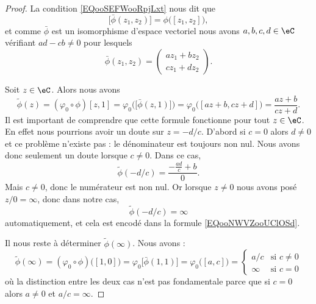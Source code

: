 \begin{proof}
    La condition \eqref{EQooSEFWooRpjLxt} nous dit que
    \begin{equation}
        \big[ \bar \phi(z_1,z_2) \big]=\phi\big( [z_1,z_2] \big),
    \end{equation}
    et comme \( \bar \phi\) est un isomorphisme d'espace vectoriel nous avons \( a,b,c,d\in \eC\) vérifiant \( ad-cb\neq 0\) pour lesquels
    \begin{equation}
        \bar \phi(z_1,z_2)=\begin{pmatrix}
            az_1+bz_2    \\ 
            cz_1+dz_2    
        \end{pmatrix}.
    \end{equation}
    
    Soit \( z\in \eC\). Alors nous avons
    \begin{equation}        \label{EQooNWVZooUClOSd}
        \tilde \phi(z)=(\varphi_0\circ\phi)[z,1]=\varphi_0\Big( \big[ \bar\phi(z,1) \big] \Big)=\varphi_0\big( [az+b,cz+d] \big)=\frac{ az+b }{ cz+d }.
    \end{equation}
    Il est important de comprendre que cette formule fonctionne pour tout \( z\in \eC\). En effet nous pourrions avoir un doute sur \( z=-d/c\). D'abord si \( c=0\) alors \( d\neq 0\) et ce problème n'existe pas : le dénominateur est toujours non nul. Nous avons donc seulement un doute lorsque \( c\neq 0\). Dans ce cas,
    \begin{equation}
        \tilde \phi(-d/c)=\frac{ -\frac{ ad }{ c }+b }{ 0 }.
    \end{equation}
    Mais \( c\neq 0\), donc le numérateur est non nul. Or lorsque \( z\neq 0\) nous avons posé \( z/0=\infty\), donc dans notre cas,
    \begin{equation}
        \tilde \phi(-d/c)=\infty
    \end{equation}
    automatiquement, et cela est encodé dans la formule \eqref{EQooNWVZooUClOSd}.

    Il nous reste à déterminer \( \tilde \phi(\infty)\). Nous avons :
    \begin{equation}
        \tilde \phi(\infty)=(\varphi_0\circ\phi)\big( [1,0] \big)=\varphi_0\big[ \bar\phi(1,1) \big]=\varphi_0\big( [a,c] \big)=\begin{cases}
            a/c    &   \text{si } c\neq 0\\
            \infty    &    \text{si }c=0
        \end{cases}
    \end{equation}
    où la distinction entre les deux cas n'est pas fondamentale parce que si \( c=0\) alors \( a\neq 0\) et \( a/c=\infty\).
\end{proof}


